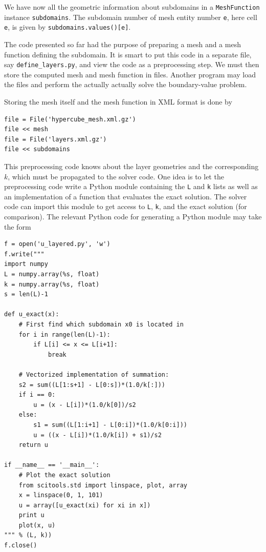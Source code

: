 We have now all the geometric information about subdomains in
a {\fontsize{12pt}{12pt}\texttt{MeshFunction}} instance {\fontsize{12pt}{12pt}\texttt{subdomains}}. The subdomain number
of mesh entity number {\fontsize{12pt}{12pt}\texttt{e}}, here cell {\fontsize{12pt}{12pt}\texttt{e}}, is given
by {\fontsize{12pt}{12pt}\texttt{subdomains.values()[e]}}.

The code presented so far had the purpose of preparing a mesh and
a mesh function defining the subdomain. It is smart to put this code
in a separate file, say {\fontsize{12pt}{12pt}\verb!define_layers.py!},
and view the code as a preprocessing step.
We must then store the computed mesh and mesh function in files.
Another program may load the files and perform the actually
actually solve the boundary-value problem.

Storing the mesh itself and the mesh function in XML format is done by
\begin{Verbatim}[fontsize=\fontsize{10pt}{10pt},tabsize=8,baselinestretch=1.05,
fontfamily=tt,xleftmargin=7mm]
file = File('hypercube_mesh.xml.gz')
file << mesh
file = File('layers.xml.gz')
file << subdomains
\end{Verbatim}
\noindent

This preprocessing code knows about the layer geometries and
the corresponding $k$, which
must be propagated to the solver code. One idea is to let the
preprocessing code write a Python module containing
the {\fontsize{12pt}{12pt}\texttt{L}} and {\fontsize{12pt}{12pt}\texttt{k}} lists as well as an implementation of a
function that evaluates the exact solution.
The solver code can import this module to get access to {\fontsize{12pt}{12pt}\texttt{L}},
{\fontsize{12pt}{12pt}\texttt{k}}, and the exact solution (for comparison).
The relevant Python code for generating a Python module may take
the form
\begin{Verbatim}[fontsize=\fontsize{10pt}{10pt},tabsize=8,baselinestretch=1.05,
fontfamily=tt,xleftmargin=7mm]
f = open('u_layered.py', 'w')
f.write("""
import numpy
L = numpy.array(%s, float)
k = numpy.array(%s, float)
s = len(L)-1

def u_exact(x):
    # First find which subdomain x0 is located in
    for i in range(len(L)-1):
        if L[i] <= x <= L[i+1]:
            break

    # Vectorized implementation of summation:
    s2 = sum((L[1:s+1] - L[0:s])*(1.0/k[:]))
    if i == 0:
        u = (x - L[i])*(1.0/k[0])/s2
    else:
        s1 = sum((L[1:i+1] - L[0:i])*(1.0/k[0:i]))
        u = ((x - L[i])*(1.0/k[i]) + s1)/s2
    return u

if __name__ == '__main__':
    # Plot the exact solution
    from scitools.std import linspace, plot, array
    x = linspace(0, 1, 101)
    u = array([u_exact(xi) for xi in x])
    print u
    plot(x, u)
""" % (L, k))
f.close()
\end{Verbatim}
\noindent


